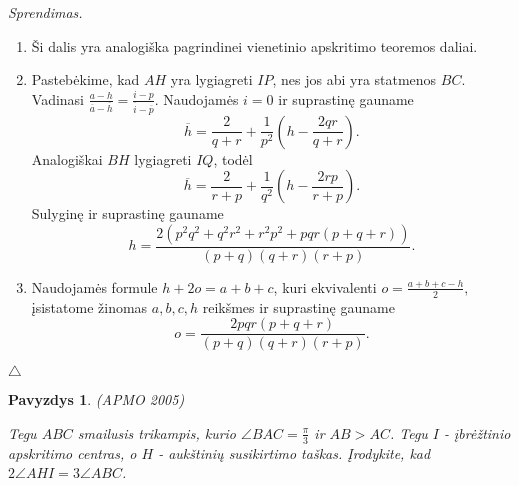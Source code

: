 \documentclass[11pt,a4paper,twoside]{book}
\newenvironment{sprendimas}{\noindent \textit{Sprendimas.}}{\hfill $\triangle$}
\newcounter{foo}[subsection]
\newtheorem{pavnr}[foo]{Pavyzdys}
\theoremstyle{definition} \newtheorem*{api}{Apibrėžimas}
\theoremstyle{remark} \newtheorem*{pastaba}{Pastaba}
\begin{document}
\begin{sprendimas}
\begin{enumerate}
\item Ši dalis yra analogiška pagrindinei vienetinio apskritimo teoremos daliai.
\item Pastebėkime, kad $AH$ yra lygiagreti $IP$, nes jos abi yra statmenos $BC$. Vadinasi $\frac{a-h}{\overline a-\overline h}=\frac{i-p}{\overline i-\overline p}.$ Naudojamės $i=0$ ir suprastinę gauname $$\overline {h}= \frac{2}{q+r} + \frac{1}{p^2}(h-\frac{2qr}{q+r}).$$ Analogiškai $BH$ lygiagreti $IQ$, todėl $$\overline {h}= \frac{2}{r+p} + \frac{1}{q^2}(h-\frac{2rp}{r+p}).$$
Sulyginę ir suprastinę gauname $$h=\frac{2(p^2q^2 + q^2r^2 + r^2p^2 + pqr(p + q+ r))}{(p+q)(q+r)(r+p)}.$$
\item Naudojamės formule $h+2o=a+b+c$, kuri ekvivalenti $o=\frac{a+b+c-h}{2},$ įsistatome žinomas $a, b, c, h$ reikšmes ir suprastinę gauname
$$o=\frac{2pqr(p+q+r)}{(p+q)(q+r)(r+p)}.$$
\end{enumerate}
\end{sprendimas}






\begin{pavnr}
(APMO 2005)

Tegu $ABC$ smailusis trikampis, kurio $\angle BAC = \frac{\pi}{3}$ ir $AB>AC$. Tegu $I$ - įbrėžtinio apskritimo centras, o $H$ - aukštinių susikirtimo taškas. Įrodykite, kad $2\angle AHI=3\angle ABC$.
\end{pavnr}
\end{document}
